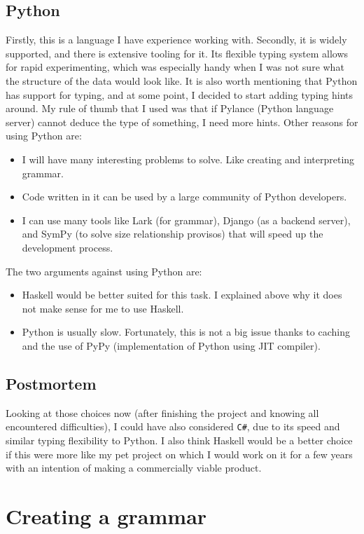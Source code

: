 \documentclass[12pt]{report}
\begin{document}
\subsection{Python}
Firstly, this is a language I have experience working with. Secondly, it is widely supported, and there is extensive tooling for it. Its flexible typing system allows for rapid experimenting, which was especially handy when I was not sure what the structure of the data would look like. It is also worth mentioning that Python has support for typing, and at some point, I decided to start adding typing hints around. My rule of thumb that I used was that if Pylance (Python language server) cannot deduce the type of something, I need more hints.  
Other reasons for using Python are:  
\begin{itemize}  
  \item I will have many interesting problems to solve. Like creating and interpreting grammar.  
  \item Code written in it can be used by a large community of Python developers.  
  \item I can use many tools like Lark (for grammar), Django (as a backend server), and SymPy (to solve size relationship provisos) that will speed up the development process.  
\end{itemize}  
The two arguments against using Python are:  
\begin{itemize}  
  \item Haskell would be better suited for this task. I explained above why it does not make sense for me to use Haskell.  
  \item Python is usually slow. Fortunately, this is not a big issue thanks to caching and the use of PyPy (implementation of Python using JIT compiler).  
\end{itemize} 
\subsection{Postmortem}
Looking at those choices now (after finishing the project and knowing all encountered difficulties), I could have also considered \verb!C#!, due to its speed and similar typing flexibility to Python. I also think Haskell would be a better choice if this were more like my pet project on which I would work on it for a few years with an intention of making a commercially viable product.
  
\section{Creating a grammar}  
  
\end{document}
